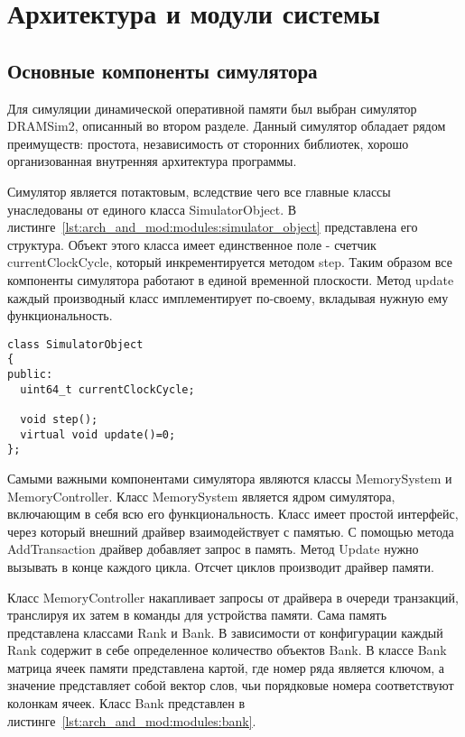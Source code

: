 \section{Архитектура и модули системы} %
\label{sec:arch_and_mod}


\subsection{Основные компоненты симулятора}
\label{sub:arch_and_mod:modules}

Для симуляции динамической оперативной памяти был выбран симулятор DRAMSim2, описанный во втором разделе. Данный симулятор обладает рядом преимуществ: простота, независимость от сторонних библиотек, хорошо организованная внутренняя архитектура программы. 

Симулятор является потактовым, вследствие чего все главные классы унаследованы от единого класса SimulatorObject. В листинге~\ref{lst:arch_and_mod:modules:simulator_object} представлена его структура. Объект этого класса имеет единственное поле - счетчик currentClockCycle, который инкрементируется методом step. Таким образом все компоненты симулятора работают в единой временной плоскости. Метод update каждый производный класс имплементирует по-своему, вкладывая нужную ему функциональность.  

\begin{lstlisting}[style=cplusplusstyle, caption={Класс SimulatorObject}, label=lst:arch_and_mod:modules:simulator_object]
class SimulatorObject
{
public:
  uint64_t currentClockCycle;

  void step();
  virtual void update()=0;
};
\end{lstlisting}

Самыми важными компонентами симулятора являются классы MemorySystem и MemoryController. 
Класс MemorySystem является ядром симулятора, включающим в себя всю его функциональность. Класс имеет простой интерфейс, через который внешний драйвер взаимодействует с памятью. С помощью метода AddTransaction драйвер добавляет запрос в память. Метод Update нужно вызывать в конце каждого цикла. Отсчет циклов производит драйвер памяти. 

Класс MemoryController  накапливает запросы от драйвера в очереди транзакций, транслируя их затем в команды для устройства памяти.  
Сама память представлена классами Rank и Bank. В зависимости от конфигурации каждый Rank содержит в себе определенное количество объектов Bank. В классе Bank матрица ячеек памяти представлена картой, где номер ряда является ключом, а значение представляет собой вектор слов, чьи порядковые номера соответствуют колонкам ячеек. Класс Bank представлен в листинге~\ref{lst:arch_and_mod:modules:bank}.

